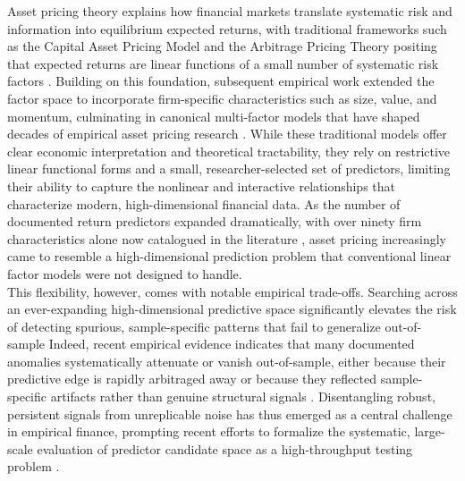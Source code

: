 \documentclass[pdflatex,sn-mathphys-num]{sn-jnl}%
\theoremstyle{thmstyleone}%
\theoremstyle{thmstyletwo}%
\theoremstyle{thmstylethree}%
\begin{document}
Asset pricing theory explains how financial markets translate systematic risk and information into equilibrium expected returns, with traditional frameworks such as the Capital Asset Pricing Model and the Arbitrage Pricing Theory positing that expected returns are linear functions of a small number of systematic risk factors \cite{sharpe1964capital,ross1978current}. Building on this foundation, subsequent empirical work extended the factor space to incorporate firm-specific characteristics such as size, value, and momentum, culminating in canonical multi-factor models that have shaped decades of empirical asset pricing research \cite{fama1992cross, fama2015five}. While these traditional models offer clear economic interpretation and theoretical tractability, they rely on restrictive linear functional forms and a small, researcher-selected set of predictors, limiting their ability to capture the nonlinear and interactive relationships that characterize modern, high-dimensional financial data. As the number of documented return predictors expanded dramatically, with over ninety firm characteristics alone now catalogued in the literature \cite{green2017characteristics}, asset pricing increasingly came to resemble a high-dimensional prediction problem that conventional linear factor models were not designed to handle.\\

This flexibility, however, comes with notable empirical trade-offs. Searching across an ever-expanding high-dimensional predictive space significantly elevates the risk of detecting spurious, sample-specific patterns that fail to generalize out-of-sample \cite{feng2020taming, giglio2022factor}  Indeed, recent empirical evidence indicates that many documented anomalies systematically attenuate or vanish out-of-sample, either because their predictive edge is rapidly arbitraged away or because they reflected sample-specific artifacts rather than genuine structural signals \cite{avramov2023machine, chu2020causal}. Disentangling robust, persistent signals from unreplicable noise has thus emerged as a central challenge in empirical finance, prompting recent efforts to formalize the systematic, large-scale evaluation of predictor candidate space as a high-throughput testing problem \cite{chen2024deep}.\\
\end{document}
